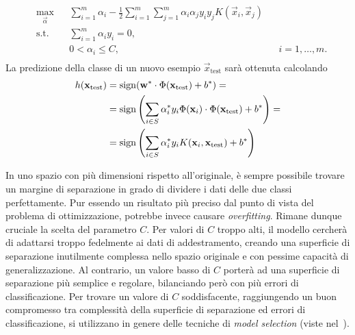 \begin{equation}\label{eq:svc:softmargin:wolfe_dual_plus_kernel_trick}
\begin{aligned}
& \max_{\vec{\alpha}}    && \sum_{i=1}^{m}\alpha_i - \frac{1}{2}\sum_{i=1}^{m}\sum_{j=1}^{m}\alpha_i\alpha_jy_iy_jK(\Vec{x}_i, \Vec{x}_j)\\
& \textrm{s.t.} && \sum_{i=1}^{m} \alpha_iy_i = 0, \\
&               && 0 < \alpha_i \leq C, && i=1,\dots,m. \\
\end{aligned}
\end{equation}
%
La predizione della classe di un nuovo esempio $\Vec{x}_\text{test}$ sarà ottenuta calcolando 
\begin{align*}
h(\Vec{x}_\text{test})  &= \sign(\Vec{w}^*\cdot\Phi(\vec{x}_{\text{test}}) +b^*) =\\
                        &= \sign\left(\sum_{i\in S} \alpha_i^*y_i \Phi(\vec{x}_i) \cdot \Phi(\vec{x}_{\text{test}}) + b^*\right)=\\
                        &= \sign\left(\sum_{i \in S}\alpha_i^*y_iK(\Vec{x}_i, \Vec{x}_\text{test}) + b^*\right)
\end{align*}

In uno spazio con più dimensioni rispetto all'originale, è sempre possibile trovare un margine di separazione in grado di dividere i dati delle due classi perfettamente. %
Pur essendo un risultato più preciso dal punto di vista del problema di ottimizzazione, potrebbe invece causare \emph{overfitting}. Rimane dunque cruciale la scelta del parametro $C$. 
Per valori di $C$ troppo alti, il modello cercherà di adattarsi troppo fedelmente ai dati di addestramento, creando una superficie di separazione inutilmente complessa nello spazio originale e con pessime capacità di generalizzazione. 
Al contrario, un valore basso di $C$ porterà ad una superficie di separazione più semplice e regolare, bilanciando però con più errori di classificazione. 
Per trovare un valore di $C$ soddisfacente, raggiungendo un buon compromesso tra complessità della superficie di separazione ed errori di classificazione, si utilizzano in genere delle tecniche di \emph{model selection} (viste nel~).  


